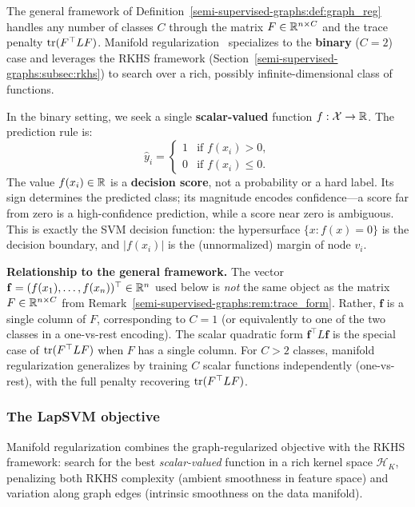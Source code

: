 \begin{notechapter}
The general framework of Definition~\ref{semi-supervised-graphs:def:graph_reg} handles any number of
classes $C$ through the matrix $F \in \mathbb{R}^{n \times C}$ and the trace penalty
$\operatorname{tr}(F^\top LF)$. Manifold regularization~\cite{semi-supervised-graphs:belkin2006} specializes to the
\textbf{binary} ($C = 2$) case and leverages the RKHS framework
(Section~\ref{semi-supervised-graphs:subsec:rkhs}) to search over a rich, possibly infinite-dimensional
class of functions.

In the binary setting, we seek a single \textbf{scalar-valued} function
$f: \mathcal{X} \to \mathbb{R}$. The prediction rule is:
\begin{equation}
\hat{y}_i = \begin{cases} 1 & \text{if } f(x_i) > 0, \\ 0 & \text{if } f(x_i) \leq 0. \end{cases}
\end{equation}
The value $f(x_i) \in \mathbb{R}$ is a \textbf{decision score}, not a probability or a
hard label. Its sign determines the predicted class; its magnitude encodes
confidence---a score far from zero is a high-confidence prediction, while a
score near zero is ambiguous. This is exactly the SVM decision function: the
hypersurface $\{x : f(x) = 0\}$ is the decision boundary, and $|f(x_i)|$ is
the (unnormalized) margin of node $v_i$.

\begin{warningbox}
\textbf{Relationship to the general framework.}
The vector $\mathbf{f} = (f(x_1), \ldots, f(x_n))^\top \in \mathbb{R}^n$ used below
is \emph{not} the same object as the matrix $F \in \mathbb{R}^{n \times C}$ from
Remark~\ref{semi-supervised-graphs:rem:trace_form}. Rather, $\mathbf{f}$ is a single column of $F$,
corresponding to $C = 1$ (or equivalently to one of the two classes in a
one-vs-rest encoding). The scalar quadratic form $\mathbf{f}^\top L\mathbf{f}$
is the special case of $\operatorname{tr}(F^\top LF)$ when $F$ has a single column. For
$C > 2$ classes, manifold regularization generalizes by training $C$ scalar
functions independently (one-vs-rest), with the full penalty recovering
$\operatorname{tr}(F^\top LF)$.
\end{warningbox}

\subsubsection*{The LapSVM objective}

Manifold regularization combines the graph-regularized objective with the RKHS
framework: search for the best \emph{scalar-valued} function in a rich kernel
space $\mathcal{H}_K$, penalizing both RKHS complexity (ambient smoothness in
feature space) and variation along graph edges (intrinsic smoothness on the
data manifold).


\end{notechapter}
